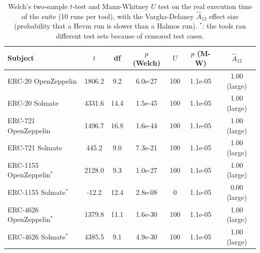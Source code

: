 \begin{table}[htb]
\centering
\begin{scriptsize}
\begin{tabular}{lcccccc}
\toprule
\textbf{Subject} & \textbf{$t$} & \textbf{df} & \textbf{$p$ (Welch)} & \textbf{$U$} & \textbf{$p$ (M-W)} & \textbf{$\hat{A}_{12}$} \\
\midrule
ERC-20 OpenZeppelin & 1806.2 & 9.2 & 6.0e-27 & 100 & 1.1e-05 & 1.00 (large) \\
ERC-20 Solmate & 4331.6 & 14.4 & 1.5e-45 & 100 & 1.1e-05 & 1.00 (large) \\
ERC-721 OpenZeppelin & 1496.7 & 16.8 & 1.6e-44 & 100 & 1.1e-05 & 1.00 (large) \\
ERC-721 Solmate & 445.2 & 9.0 & 7.3e-21 & 100 & 1.1e-05 & 1.00 (large) \\
ERC-1155 OpenZeppelin$^{*}$ & 2128.0 & 9.3 & 1.0e-27 & 100 & 1.1e-05 & 1.00 (large) \\
ERC-1155 Solmate$^{*}$ & -12.2 & 12.4 & 2.8e-08 & 0 & 1.1e-05 & 0.00 (large) \\
ERC-4626 OpenZeppelin$^{*}$ & 1379.8 & 11.1 & 1.6e-30 & 100 & 1.1e-05 & 1.00 (large) \\
ERC-4626 Solmate$^{*}$ & 4385.5 & 9.1 & 4.9e-30 & 100 & 1.1e-05 & 1.00 (large) \\
\bottomrule
\end{tabular}
\end{scriptsize}
\caption{Welch's two-sample $t$-test and Mann-Whitney $U$ test on the real execution time of the suite (10 runs per tool), with the Vargha-Delaney $\hat{A}_{12}$ effect size (probability that a Hevm run is slower than a Halmos run). $^{*}$: the tools ran different test sets because of censored test cases.}
\label{tab:stats}
\end{table}
